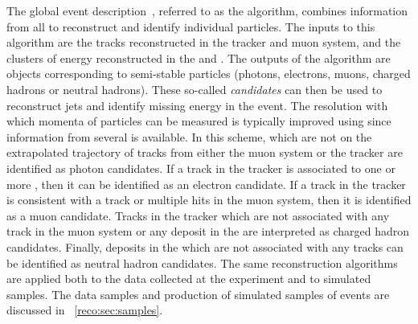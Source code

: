 The \CMS global event description~\cite{CMS-PAS-PFT-09-001,CMS-PAS-PFT-10-001}, referred to as the \PF algorithm, combines information from all \CMS \subdetector\s to reconstruct and identify individual particles. The inputs to this algorithm are the tracks reconstructed in the tracker and muon system, and the clusters of energy reconstructed in the \ECAL and \HCAL. The outputs of the algorithm are objects corresponding to semi-stable particles (photons, electrons, muons, charged hadrons or neutral hadrons). These so-called \PF \emph{candidates} can then be used to reconstruct jets and identify missing energy in the event. The resolution with which momenta of particles can be measured is typically improved using \PF since information from several \subdetector\s is available. In this scheme, \ECAL \SC\s which are not on the extrapolated trajectory of tracks from either the muon system or the tracker are identified as photon candidates. If a track in the tracker is associated to one or more \ECAL \SC\s, then it can be identified as an electron candidate. If a track in the tracker is consistent with a track or multiple hits in the muon system, then it is identified as a muon candidate. Tracks in the tracker which are not associated with any track in the muon system or any deposit in the \ECAL are interpreted as charged hadron candidates. Finally, deposits in the \HCAL which are not associated with any tracks can be identified as neutral hadron candidates.
The same reconstruction algorithms are applied both to the data collected at the \CMS experiment and to simulated samples. %
The data samples and production of simulated samples of \MC events are discussed in \Sec~\ref{reco:sec:samples}.


